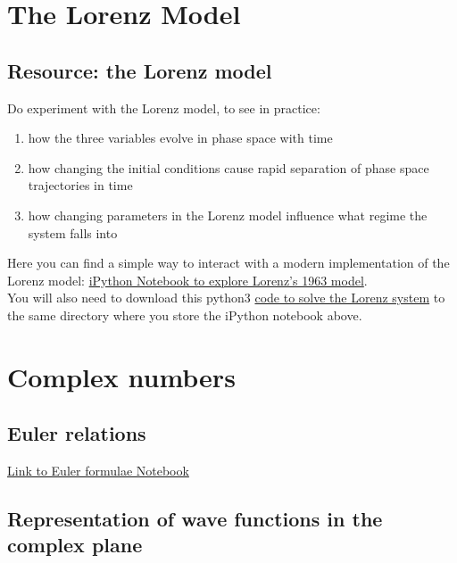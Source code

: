 \newpage
\chapter{The Lorenz Model}

\section{Resource: the Lorenz model}
Do experiment with the Lorenz model, to see in practice:
\begin{enumerate}
\item how the three variables evolve in phase space with time
\item how changing the initial conditions cause rapid separation of phase space trajectories in time
\item how changing parameters in the Lorenz model influence what regime the system falls into
\end{enumerate}

\vspace{1em} 

Here you can find a simple way to interact with a modern implementation of the Lorenz model: 
	\href{https://github.com/pierluigividale/MTMW14/blob/main/Notebooks/run_Lorenz_example.ipynb}{ iPython Notebook to explore Lorenz's 1963 model}.\\
	
You will also need to download this python3 \href{https://github.com/pierluigividale/MTMW14/blob/main/Notebooks/make_lorenz_animation.py}{code to solve the Lorenz system} to the same directory where you store the iPython notebook above.

\vspace{1em} 

\newpage
\chapter{Complex numbers}

\section{Euler relations}
\href{https://github.com/pierluigividale/MTMW14/blob/main/Notebooks/Euler%20equations.ipynb}{Link to Euler formulae Notebook}

\section{Representation of wave functions in the complex plane}

